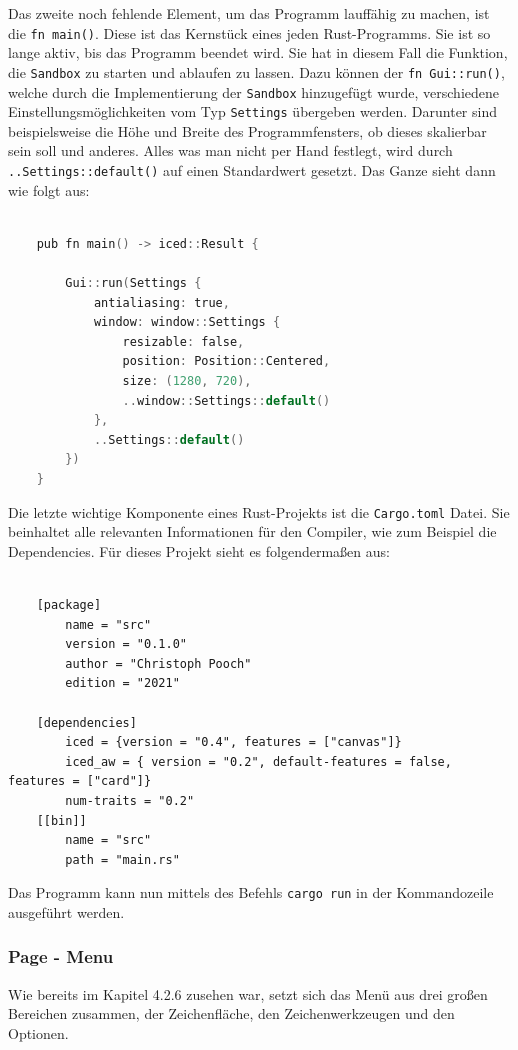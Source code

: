 Das zweite noch fehlende Element, um das Programm lauffähig zu machen, ist die \lstinline{fn main()}. Diese ist das Kernstück eines jeden Rust-Programms. Sie ist so lange aktiv, bis das Programm beendet wird.
Sie hat in diesem Fall die Funktion, die \lstinline{Sandbox} zu starten und ablaufen zu lassen. Dazu können der \lstinline{fn Gui::run()}, welche durch die Implementierung der \lstinline{Sandbox} hinzugefügt wurde, verschiedene 
Einstellungsmöglichkeiten vom Typ \lstinline{Settings} übergeben werden. Darunter sind beispielsweise die Höhe und Breite des Programmfensters, ob dieses skalierbar sein soll und anderes. Alles was man nicht per Hand festlegt,
wird durch \lstinline{..Settings::default()} auf einen Standardwert gesetzt. Das Ganze sieht dann wie folgt aus: 

\begin{lstlisting}[language=C]
  
    pub fn main() -> iced::Result {

        Gui::run(Settings {
            antialiasing: true,
            window: window::Settings {
                resizable: false,
                position: Position::Centered,
                size: (1280, 720),
                ..window::Settings::default()
            },
            ..Settings::default()
        })
    }

\end{lstlisting}

Die letzte wichtige Komponente eines Rust-Projekts ist die \lstinline{Cargo.toml} Datei. Sie beinhaltet alle relevanten Informationen für den Compiler, wie zum Beispiel die 
Dependencies. Für dieses Projekt sieht es folgendermaßen aus:

\begin{lstlisting}
  
    [package]
        name = "src"
        version = "0.1.0"
        author = "Christoph Pooch"
        edition = "2021"

    [dependencies]
        iced = {version = "0.4", features = ["canvas"]}
        iced_aw = { version = "0.2", default-features = false, features = ["card"]}
        num-traits = "0.2"
    [[bin]]
        name = "src"
        path = "main.rs"

\end{lstlisting}

Das Programm kann nun mittels des Befehls \lstinline{cargo run} in der Kommandozeile ausgeführt werden.

\subsubsection{Page - Menu}
Wie bereits im Kapitel 4.2.6 zusehen war, setzt sich das Menü aus drei großen Bereichen zusammen, der Zeichenfläche, den Zeichenwerkzeugen und den Optionen. \linebreak

